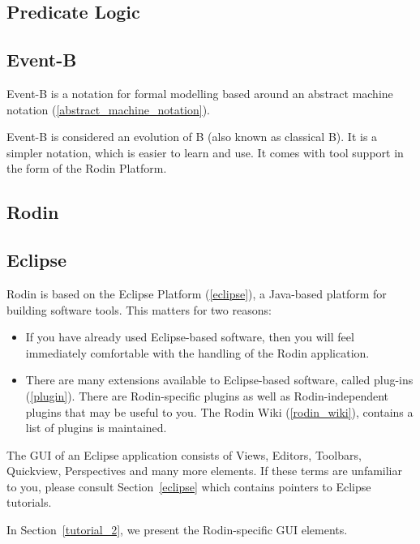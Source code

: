\subsection{Predicate Logic}

\subsection{Event-B}

Event-B is a notation for formal modelling based around an abstract machine notation (\ref{abstract_machine_notation}).

Event-B is considered an evolution of B (also known as classical B). It is a simpler notation, which is easier to learn and use. It comes with tool support in the form of the Rodin Platform.

\subsection{Rodin}

\subsection{Eclipse}

Rodin is based on the Eclipse Platform (\ref{eclipse}), a Java-based platform for building software tools.  This matters for two reasons:
\begin{itemize}
	\item If you have already used Eclipse-based software, then you will feel immediately comfortable with the handling of the Rodin application.
	\item There are many extensions available to Eclipse-based software, called plug-ins (\ref{plugin}).  There are Rodin-specific plugins as well as Rodin-independent plugins that may be useful to you.  The Rodin Wiki (\ref{rodin_wiki}), contains a list of plugins is maintained.
\end{itemize}

The GUI of an Eclipse application consists of Views, Editors, Toolbars, Quickview, Perspectives and many more elements.  If these terms are unfamiliar to you, please consult Section~\ref{eclipse} which contains pointers to Eclipse tutorials.

In Section~\ref{tutorial_2}, we present the Rodin-specific GUI elements.

